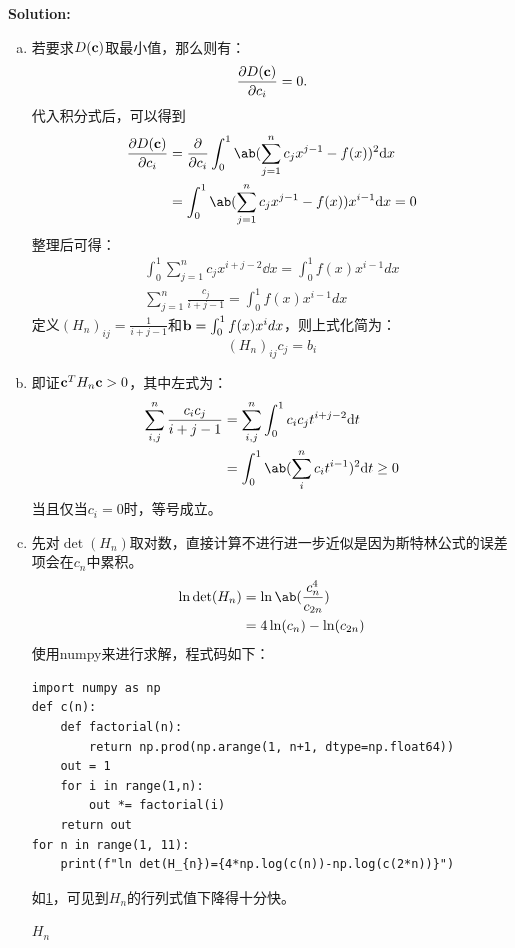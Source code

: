 \documentclass[12pt, a4paper, oneside]{article}
\begin{document}
\textbf{Solution:}
\begin{enumerate}[(a)]
\item 若要求$D(\textbf{c})$取最小值，那么则有：
\begin{equation}
    \frac{\partial D(\textbf{c})}{\partial c_i} = 0.
\end{equation}
代入积分式后，可以得到
\begin{align*}
    \pdv{D(\vb{c})}{c_i} &= \pdv{}{c_i}\int_0^1\ab(\sum_{j=1}^nc_jx^{j-1}-f(x))^2\dd x\\
    &= \int_0^1\ab(\sum_{j=1}^nc_jx^{j-1}-f(x))x^{i-1}\dd x = 0
\end{align*}
整理后可得：
\begin{align*}
    \int_0^1\sum_{j=1}^nc_jx^{i+j-2}\dd x = \int_0^1f(x)x^{i-1}dx \\
    \sum_{j=1}^n\frac{c_j}{i+j-1} = \int_0^1f(x)x^{i-1}dx
\end{align*}
定义$(H_n)_{ij}=\frac{1}{i+j-1}$和$\textbf{b}=\int_0^1f(x)x^i dx$，则上式化简为：
\begin{equation}
    (H_n)_{ij}c_j=b_i
\end{equation}
\item 即证$\textbf{c}^TH_n\textbf{c}>0$，其中左式为：
\begin{align*}
    \sum_{i,j}^n\frac{c_ic_j}{i+j-1}&=\sum_{i,j}^n\int_0^1c_ic_jt^{i+j-2}\dd t \\
    &=\int_0^1\ab(\sum_i^nc_it^{i-1})^2 \dd t \ge 0
\end{align*}
当且仅当$c_i=0$时，等号成立。 
\item 先对$\det(H_n)$取对数，直接计算不进行进一步近似是因为斯特林公式的误差项会在$c_n$中累积。
\begin{align*}
    \ln\det(H_n)&=\ln\ab(\frac{c_n^4}{c_{2n}})\\
                &=4\ln(c_n) - \ln(c_{2n})\\
\end{align*}
使用numpy来进行求解，程式码如下：
\begin{verbatim}
import numpy as np
def c(n):
    def factorial(n):
        return np.prod(np.arange(1, n+1, dtype=np.float64))
    out = 1
    for i in range(1,n):
        out *= factorial(i)
    return out
for n in range(1, 11):
    print(f"ln det(H_{n})={4*np.log(c(n))-np.log(c(2*n))}")
\end{verbatim}
如\ref{tab:2}，可见到$H_n$的行列式值下降得十分快。
\begin{table}[htp]
\caption{$H_n$}
\label{tab:2}
\begin{tabular}{|c|c|c|c|c|c|c|c|c|c|}
    \hline

\end{tabular}
\end{table}
\end{enumerate}
\end{document}
